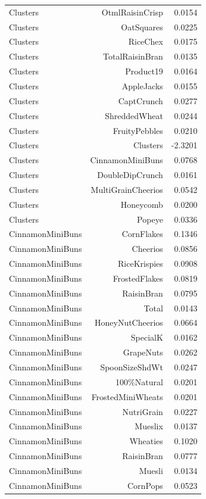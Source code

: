 \begin{longtable}{@{}lrr@{}}
Clusters & OtmlRaisinCrisp & 0.0154 \\
Clusters & OatSquares & 0.0225 \\
Clusters & RiceChex & 0.0175 \\
Clusters & TotalRaisinBran & 0.0135 \\
Clusters & Product19 & 0.0164 \\
Clusters & AppleJacks & 0.0155 \\
Clusters & CaptCrunch & 0.0277 \\
Clusters & ShreddedWheat & 0.0244 \\
Clusters & FruityPebbles & 0.0210 \\
Clusters & Clusters & -2.3201 \\
Clusters & CinnamonMiniBuns & 0.0768 \\
Clusters & DoubleDipCrunch & 0.0161 \\
Clusters & MultiGrainCheerios & 0.0542 \\
Clusters & Honeycomb & 0.0200 \\
Clusters & Popeye & 0.0336 \\
CinnamonMiniBuns & CornFlakes & 0.1346 \\
CinnamonMiniBuns & Cheerios & 0.0856 \\
CinnamonMiniBuns & RiceKrispies & 0.0908 \\
CinnamonMiniBuns & FrostedFlakes & 0.0819 \\
CinnamonMiniBuns & RaisinBran & 0.0795 \\
CinnamonMiniBuns & Total & 0.0143 \\
CinnamonMiniBuns & HoneyNutCheerios & 0.0664 \\
CinnamonMiniBuns & SpecialK & 0.0162 \\
CinnamonMiniBuns & GrapeNuts & 0.0262 \\
CinnamonMiniBuns & SpoonSizeShdWt & 0.0247 \\
CinnamonMiniBuns & 100\%Natural & 0.0201 \\
CinnamonMiniBuns & FrostedMiniWheats & 0.0201 \\
CinnamonMiniBuns & NutriGrain & 0.0227 \\
CinnamonMiniBuns & Mueslix & 0.0137 \\
CinnamonMiniBuns & Wheaties & 0.1020 \\
CinnamonMiniBuns & RaisinBran & 0.0777 \\
CinnamonMiniBuns & Muesli & 0.0134 \\
CinnamonMiniBuns & CornPops & 0.0523 \\

\end{longtable}

